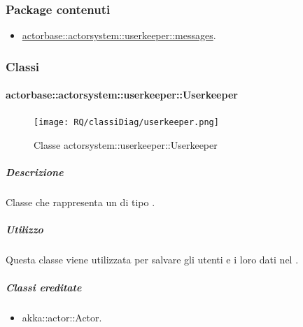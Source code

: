 \documentclass{scalatekids-article}
\begin{document}
\subsubsection{Package contenuti}
\begin{itemize}
\item \hyperref[sec:actorbase::actorsystem::userkeeper::messages]{actorbase::actorsystem::userkeeper::messages}.
\end{itemize}

\subsubsection{Classi}

\paragraph{actorbase::actorsystem::userkeeper::Userkeeper}
\label{sec:actorbase::actorsystem::userkeeper::Userkeeper}

\begin{figure}[H]
  \begin{center}
    \texttt{[image: RQ/classiDiag/userkeeper.png]}
    \caption{Classe actorsystem::userkeeper::Userkeeper}
  \end{center}
\end{figure}

\subparagraph{Descrizione}
Classe che rappresenta un  di tipo .

\subparagraph{Utilizzo}
Questa classe viene utilizzata per salvare gli utenti e i loro dati nel .

\subparagraph{Classi ereditate}
\begin{itemize}
\item akka::actor::Actor.
\end{itemize}
\end{document}
